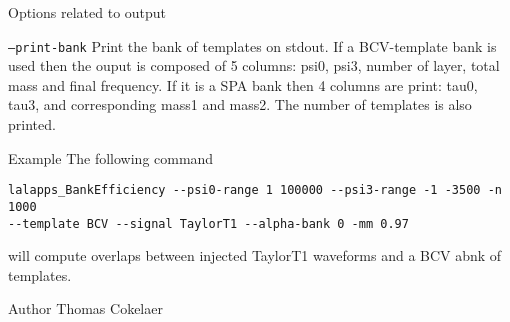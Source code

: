 \begin{entry}
\item[Options related to output]\leavevmode
\begin{entry}
\item[\texttt{--print-bank}]
Print the bank of templates on stdout. If a BCV-template bank is used then the ouput is composed of
5 columns: psi0, psi3, number of layer, total mass and final frequency. If it is a SPA bank
then 4 columns are print: tau0, tau3, and corresponding mass1 and mass2. The number of templates is 
also printed.

\end{entry}

\item[Example]\leavevmode
The following command
\begin{verbatim}
lalapps_BankEfficiency --psi0-range 1 100000 --psi3-range -1 -3500 -n 1000 
--template BCV --signal TaylorT1 --alpha-bank 0 -mm 0.97
\end{verbatim}

will compute overlaps between injected TaylorT1 waveforms and a BCV abnk of templates. 


\item[Author]
Thomas Cokelaer

\end{entry}
